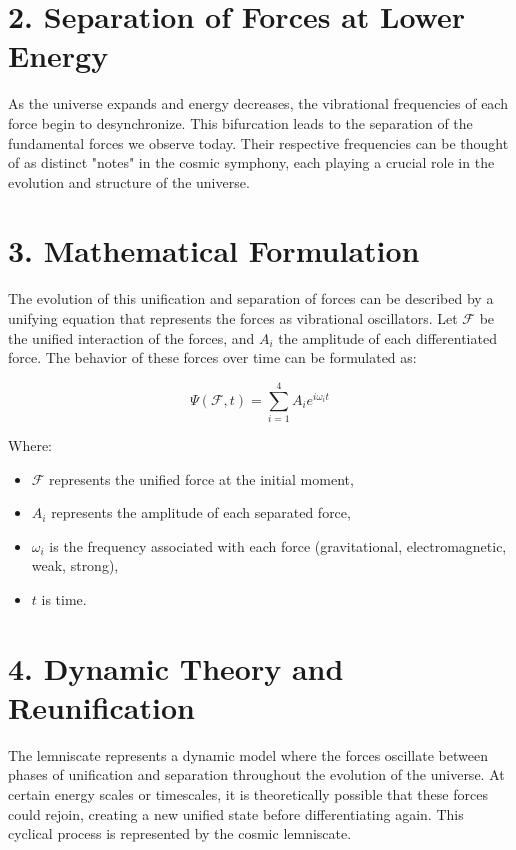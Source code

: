 \documentclass{article}
\begin{document}
\section{2. Separation of Forces at Lower Energy}

As the universe expands and energy decreases, the vibrational frequencies of each force begin to desynchronize. This bifurcation leads to the separation of the fundamental forces we observe today. Their respective frequencies can be thought of as distinct "notes" in the cosmic symphony, each playing a crucial role in the evolution and structure of the universe.

\section{3. Mathematical Formulation}

The evolution of this unification and separation of forces can be described by a unifying equation that represents the forces as vibrational oscillators. Let \( \mathcal{F} \) be the unified interaction of the forces, and \( A_i \) the amplitude of each differentiated force. The behavior of these forces over time can be formulated as:

\[
\Psi(\mathcal{F}, t) = \sum_{i=1}^{4} A_i e^{i\omega_i t}
\]

Where:
\begin{itemize}
    \item \( \mathcal{F} \) represents the unified force at the initial moment,
    \item \( A_i \) represents the amplitude of each separated force,
    \item \( \omega_i \) is the frequency associated with each force (gravitational, electromagnetic, weak, strong),
    \item \( t \) is time.
\end{itemize}

\section{4. Dynamic Theory and Reunification}

The lemniscate represents a dynamic model where the forces oscillate between phases of unification and separation throughout the evolution of the universe. At certain energy scales or timescales, it is theoretically possible that these forces could rejoin, creating a new unified state before differentiating again. This cyclical process is represented by the cosmic lemniscate.
\end{document}
